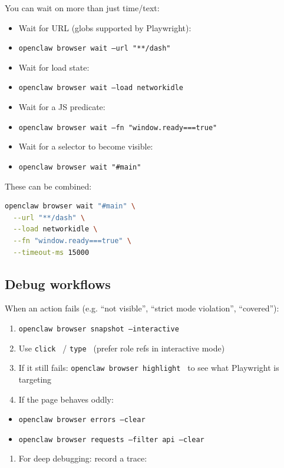 You can wait on more than just time/text:

\begin{itemize}
  \item Wait for URL (globs supported by Playwright):
  \item \texttt{openclaw browser wait --url "**/dash"}
  \item Wait for load state:
  \item \texttt{openclaw browser wait --load networkidle}
  \item Wait for a JS predicate:
  \item \texttt{openclaw browser wait --fn "window.ready===true"}
  \item Wait for a selector to become visible:
  \item \texttt{openclaw browser wait "\#main"}
\end{itemize}


These can be combined:

\begin{lstlisting}[language=bash]
openclaw browser wait "#main" \
  --url "**/dash" \
  --load networkidle \
  --fn "window.ready===true" \
  --timeout-ms 15000
\end{lstlisting}


\subsection{Debug workflows}


When an action fails (e.g. “not visible”, “strict mode violation”, “covered”):

\begin{enumerate}
  \item \texttt{openclaw browser snapshot --interactive}
  \item Use \texttt{click } / \texttt{type } (prefer role refs in interactive mode)
  \item If it still fails: \texttt{openclaw browser highlight } to see what Playwright is targeting
  \item If the page behaves oddly:
\end{enumerate}

\begin{itemize}
  \item \texttt{openclaw browser errors --clear}
  \item \texttt{openclaw browser requests --filter api --clear}
\end{itemize}

\begin{enumerate}
  \item For deep debugging: record a trace:
\end{enumerate}

